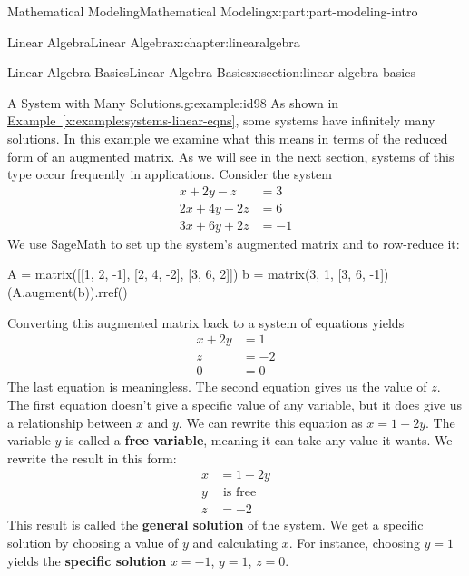 \documentclass[oneside,10pt,]{book}
\newcommand{\xreffont}{\relax}
\newcommand{\terminology}[1]{\textbf{#1}}
\numberwithin{equation}{section}
\begin{document}
\begin{partptx}{Mathematical Modeling}{}{Mathematical Modeling}{}{}{x:part:part-modeling-intro}
\begin{chapterptx}{Linear Algebra}{}{Linear Algebra}{}{}{x:chapter:linearalgebra}
\begin{sectionptx}{Linear Algebra Basics}{}{Linear Algebra Basics}{}{}{x:section:linear-algebra-basics}
\begin{example}{A System with Many Solutions.}{g:example:id98}
As shown in \hyperref[x:example:systems-linear-eqns]{Example~{\xreffont\ref{x:example:systems-linear-eqns}}}, some systems have infinitely many solutions. In this example we examine what this means in terms of the reduced form of an augmented matrix. As we will see in the next section, systems of this type occur frequently in applications. Consider the system%
%
\begin{equation*}
\begin{aligned}
x + 2y - z &= 3 \\
2x + 4y - 2z &= 6 \\
3x + 6y +2z &= -1
\end{aligned}
\end{equation*}
We use SageMath to set up the system's augmented matrix and to row-reduce it:%
\begin{sageinput}
A = matrix([[1, 2, -1], [2, 4, -2], [3, 6, 2]])
b = matrix(3, 1, [3, 6, -1])
(A.augment(b)).rref()
\end{sageinput}
\begin{sageoutput}
[ 1  2  0  1]
[ 0  0  1 -2]
[ 0  0  0  0]
\end{sageoutput}
Converting this augmented matrix back to a system of equations yields%
%
\begin{equation*}
\begin{aligned}
x+2y &=1 \\
z &= -2 \\
0 &= 0
\end{aligned}
\end{equation*}
The last equation is meaningless. The second equation gives us the value of \(z\). The first equation doesn’t give a specific value of any variable, but it does give us a relationship between \(x\) and \(y\). We can rewrite this equation as \(x = 1 - 2y\). The variable \(y\) is called a \terminology{free variable}, meaning it can take any value it wants. We rewrite the result in this form:%
%
\begin{equation*}
\begin{aligned}
x & =1-2y \\
y & \text{ is free} \\
z & =-2
\end{aligned}
\end{equation*}
This result is called the \terminology{general solution} of the system. We get a specific solution by choosing a value of \(y\) and calculating \(x\). For instance, choosing \(y = 1\) yields the \terminology{specific solution} \(x = -1\), \(y = 1\), \(z = 0\).%
\end{example}

\end{sectionptx}
\end{chapterptx}
\end{partptx}
\end{document}
